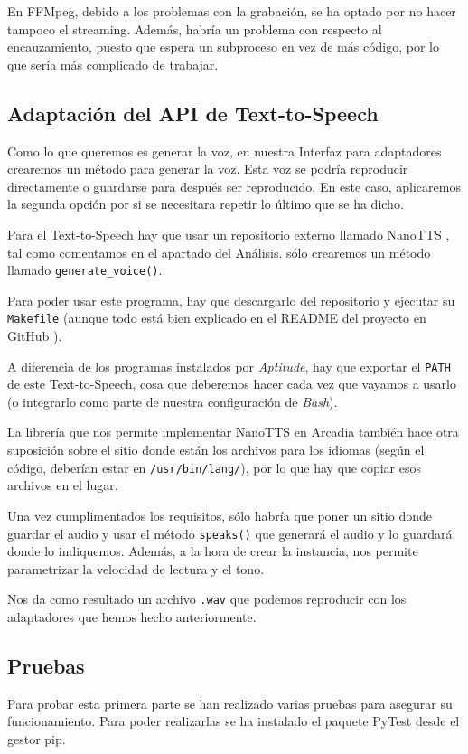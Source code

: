 En FFMpeg, debido a los problemas con la grabación, se ha optado por no hacer tampoco el streaming. Además, habría un problema con respecto al encauzamiento, puesto que espera un subproceso en vez de más código, por lo que sería más complicado de trabajar.

\subsection{Adaptación del API de Text-to-Speech}
Como lo que queremos es generar la voz, en nuestra Interfaz para adaptadores crearemos un método para generar la voz. Esta voz se podría reproducir directamente o guardarse para después ser reproducido. En este caso, aplicaremos la segunda opción por si se necesitara repetir lo último que se ha dicho.

Para el Text-to-Speech hay que usar un repositorio externo llamado NanoTTS \cite{nanotts}, tal como comentamos en el apartado del Análisis. sólo crearemos un método llamado \texttt{generate\_voice()}.

Para poder usar este programa, hay que descargarlo del repositorio y ejecutar su \texttt{Makefile} (aunque todo está bien explicado en el README del proyecto en GitHub \cite{nanotts}).

A diferencia de los programas instalados por \textit{Aptitude}, hay que exportar el \texttt{PATH} de este Text-to-Speech, cosa que deberemos hacer cada vez que vayamos a usarlo (o integrarlo como parte de nuestra configuración de \textit{Bash}).

La librería que nos permite implementar NanoTTS en Arcadia también hace otra suposición sobre el sitio donde están los archivos para los idiomas (según el código, deberían estar en \texttt{/usr/bin/lang/}), por lo que hay que copiar esos archivos en el lugar.

Una vez cumplimentados los requisitos, sólo habría que poner un sitio donde guardar el audio y usar el método \texttt{speaks()} que generará el audio y lo guardará donde lo indiquemos. Además, a la hora de crear la instancia, nos permite parametrizar la velocidad de lectura y el tono.

Nos da como resultado un archivo \texttt{.wav} que podemos reproducir con los adaptadores que hemos hecho anteriormente.

\subsection{Pruebas}
Para probar esta primera parte se han realizado varias pruebas para asegurar su funcionamiento. Para poder realizarlas se ha instalado
el paquete PyTest desde el gestor pip.

